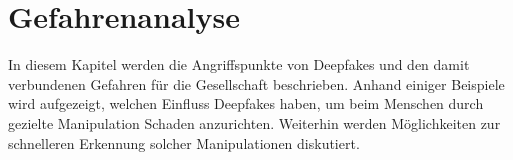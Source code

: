 \section{Gefahrenanalyse}
In diesem Kapitel werden die Angriffspunkte von Deepfakes und den damit verbundenen Gefahren für die Gesellschaft beschrieben.
Anhand einiger Beispiele wird aufgezeigt, welchen Einfluss Deepfakes haben, um beim Menschen durch gezielte Manipulation Schaden anzurichten.
Weiterhin werden Möglichkeiten zur schnelleren Erkennung solcher Manipulationen diskutiert.





